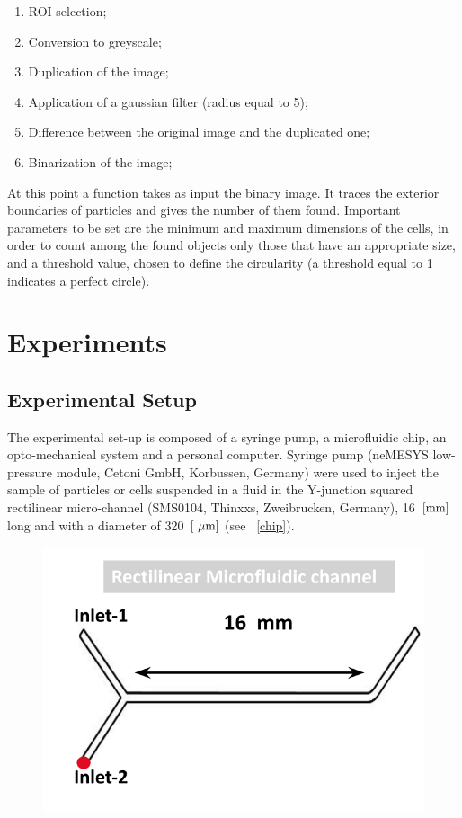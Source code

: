 \documentclass[journal]{IEEEtran}
\theoremstyle{definition}
\theoremstyle{remark}
\begin{document}
 \begin{enumerate}
 	\item ROI selection;
 	\item Conversion to greyscale;
 	\item Duplication of the image;
 	\item Application of a gaussian filter (radius equal to 5);
 	\item Difference between the original image and the duplicated one;
 	\item Binarization of the image;
 \end{enumerate}
At this point a function takes as input the binary image. It traces the exterior boundaries of particles and gives the number of them found.
Important parameters to be set are the minimum and maximum dimensions of the cells, in order to count among the found objects only those that have an appropriate size, and a threshold value, chosen to define the circularity (a threshold equal to 1 indicates a perfect circle).


\section{Experiments}

\subsection{Experimental Setup}

The experimental set-up is composed of a syringe pump, a microfluidic chip, an opto-mechanical system and a personal computer. Syringe pump (neMESYS low-pressure module, Cetoni GmbH,
Korbussen, Germany) were used to inject the sample of particles or cells suspended in a fluid in the Y-junction squared rectilinear micro-channel (SMS0104, Thinxxs, Zweibrucken, Germany), 16~$[\rm mm]$ long and with a diameter of 320~$[\rm~\mu m]$ (see ~\fig\ref{chip}).

\begin{figure}[h]
	\centering
	\includegraphics[width=0.5\columnwidth]{images/chip}
\end{figure}
\end{document}
